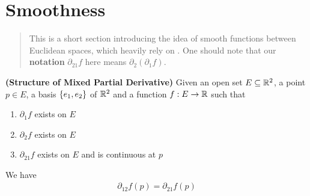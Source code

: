 \documentclass{report}
\begin{document}
\section{Smoothness}
\label{Smoothness}
\begin{abstract}
This is a short section introducing the idea of smooth functions between Euclidean spaces, which heavily rely on . One should note that our \textbf{notation} $\partial _{21}f$ here means $\partial_2 (\partial_1 f)$.  
\end{abstract}
\begin{theorem}
\label{SoMPD}
\textbf{(Structure of Mixed Partial Derivative)} Given an open set $E\subseteq \mathbb{R}^2$, a point $p\in  E$, a basis $\{ e_1,e_2 \}$ of $\mathbb{R}^2$ and a function $f:E\rightarrow \mathbb{R}$ such that 
\begin{enumerate}[label=(\alph*)]
  \item $\partial_1 f$ exists on $E$
   \item $\partial_2 f$ exists on $E$
     \item $\partial_{21} f$ exists on $E$ and is continuous at $p$
\end{enumerate}
We have
\begin{align*}
\partial_{12} f(p)=\partial_{21}f(p)
\end{align*}
\end{theorem}
\end{document}
